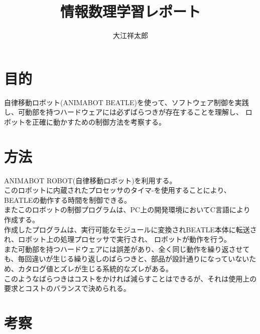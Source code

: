 \documentclass{jsarticle}
\begin{document}
\title{情報数理学習レポート}
\author{大江祥太郎}

\section{目的}
自律移動ロボット(ANIMABOT BEATLE)を使って、ソフトウェア制御を実践し、可動部を持つハードウェアには必ずばらつきが存在することを理解し、
ロボットを正確に動かすための制御方法を考察する。

\section{方法}
ANIMABOT ROBOT(自律移動ロボット)を利用する。\\
このロボットに内蔵されたプロセッサのタイマ-を使用することにより、BEATLEの動作する時間を制御できる。\\
またこのロボットの制御プログラムは、PC上の開発環境においてC言語により作成する。\\
作成したプログラムは、実行可能なモジュールに変換されBEATLE本体に転送され、ロボット上の処理プロセッサで実行され、
ロボットが動作を行う。\\
また可動部を持つハードウェアには誤差があり、全く同じ動作を繰り返させても、毎回違いが生じる繰り返しのばらつきと、部品が設計通りになっていないため、カタログ値とズレが生じる系統的なズレがある。\\
このようなばらつきはコストをかければ減らすことはできるが、それは使用上の要求とコストのバランスで決められる。\\

\section{考察}
\end{document}
